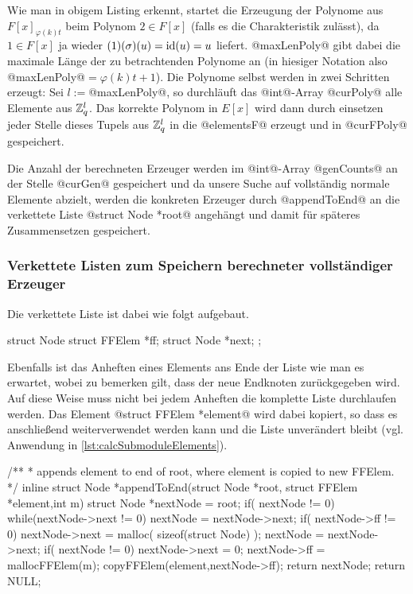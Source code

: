 Wie man in obigem Listing erkennt, startet die Erzeugung der Polynome aus 
$F[x]_{\varphi(k)t}$ beim Polynom $2 \in F[x]$ (falls es die Charakteristik
zulässt), da $1\in F[x]$ ja wieder $(1)(\sigma)(u) = \operatorname{id}(u) = u$ liefert.
@maxLenPoly@ gibt dabei die maximale Länge der zu betrachtenden Polynome an (in
hiesiger Notation also @maxLenPoly@$= \varphi(k)t+1$). Die Polynome selbst
werden in zwei Schritten erzeugt: Sei $l := $@maxLenPoly@, so
durchläuft das @int@-Array @curPoly@ alle Elemente aus $\mathbb{Z}_q^l$. 
Das korrekte Polynom in $E[x]$ wird dann durch einsetzen jeder Stelle 
dieses Tupels aus $\mathbb{Z}_q^l$ in die @elementsF@ erzeugt und in 
@curFPoly@ gespeichert.

Die Anzahl der berechneten Erzeuger werden im @int@-Array @genCounts@ an der
Stelle @curGen@ gespeichert und da unsere Suche auf vollständig normale
Elemente abzielt, werden die konkreten Erzeuger durch @appendToEnd@ 
an die verkettete Liste @struct Node *root@ angehängt und 
damit für späteres Zusammensetzen gespeichert.


\subsubsection{Verkettete Listen zum Speichern berechneter vollständiger 
Erzeuger}

Die verkettete Liste ist dabei wie folgt aufgebaut.

\begin{ccode}[caption={Aus \url{../Sage/enumeratePCNs.c}},
  firstnumber=175, label=lst:structNode]
struct Node {
    struct FFElem *ff;
    struct Node *next;
};
\end{ccode}

Ebenfalls ist das Anheften eines Elements ans Ende der Liste wie man es
erwartet, wobei zu bemerken gilt, dass der neue Endknoten zurückgegeben wird.
Auf diese Weise muss nicht bei jedem Anheften die komplette Liste durchlaufen
werden. Das Element @struct FFElem *element@ wird dabei kopiert, so dass es
anschließend weiterverwendet werden kann und die Liste unverändert bleibt 
(vgl. Anwendung in \autoref{lst:calcSubmoduleElements}).

\begin{ccode}[caption={Aus \url{../Sage/enumeratePCNs.c}},
  firstnumber=180, label=lst:appendToEnd]
/**
 * appends element to end of root, where element is copied to new FFElem.
 */
inline struct Node *appendToEnd(struct Node *root, struct FFElem *element,int m){
    struct Node *nextNode = root;
    if( nextNode != 0){
        while(nextNode->next != 0){
            nextNode = nextNode->next;
        }
        if( nextNode->ff != 0){
            nextNode->next = malloc( sizeof(struct Node) );
            nextNode = nextNode->next;
        }
        if( nextNode != 0){
            nextNode->next = 0;
            nextNode->ff = mallocFFElem(m);
            copyFFElem(element,nextNode->ff);
            return nextNode;
        }
    }
    return NULL;
}
\end{ccode}


